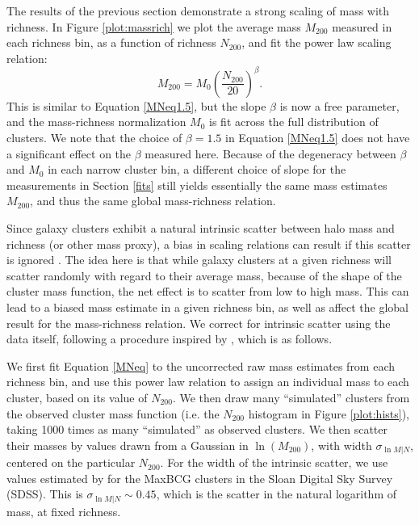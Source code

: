 \label{sec:MN}
The results of the previous section demonstrate a strong scaling of mass with richness. In Figure \ref{plot:massrich} we plot the average mass $M_{200}$ measured in each richness bin, as a function of richness $N_{200}$, and fit the power law scaling relation:
\begin{equation}
\label{MNeq}
M_{200} = M_0 \left( \frac{N_{200}}{20} \right)^\beta.
\end{equation}
This is similar to Equation \ref{MNeq1.5}, but the slope $\beta$ is now a free parameter, and the mass-richness normalization $M_0$ is fit across the full distribution of clusters. We note that the choice of $\beta=1.5$ in Equation \ref{MNeq1.5} does not have a significant effect on the $\beta$ measured here. Because of the degeneracy between $\beta$ and $M_0$ in each narrow cluster bin, a different choice of slope for the measurements in Section \ref{fits} still yields essentially the same mass estimates $M_{200}$, and thus the same global mass-richness relation.

Since galaxy clusters exhibit a natural intrinsic scatter between halo mass and richness (or other mass proxy), a bias in scaling relations can result if this scatter is ignored \citep{Rozo09a}. The idea here is that while galaxy clusters at a given richness will scatter randomly with regard to their average mass, because of the shape of the cluster mass function, the net effect is to scatter from low to high mass. This can lead to a biased mass estimate in a given richness bin, as well as affect the global result for the mass-richness relation. We correct for intrinsic scatter using the data itself, following a procedure inspired by \citet{Velander14}, which is as follows.

We first fit Equation \ref{MNeq} to the uncorrected raw mass estimates from each richness bin, and use this power law relation to assign an individual mass to each cluster, based on its value of $N_{200}$. We then draw many ``simulated'' clusters from the observed cluster mass function (i.e. the $N_{200}$ histogram in Figure \ref{plot:hists}), taking 1000 times as many ``simulated'' as observed clusters. We then scatter their masses by values drawn from a Gaussian in $\ln (M_{200})$, with width $\sigma_{\ln M|N}$, centered on the particular $N_{200}$. For the width of the intrinsic scatter, we use values estimated by \citet{Rozo09a} for the MaxBCG clusters in the Sloan Digital Sky Survey (SDSS). This is $\sigma_{\ln M|N} \sim 0.45$, which is the scatter in the natural logarithm of mass, at fixed richness.

